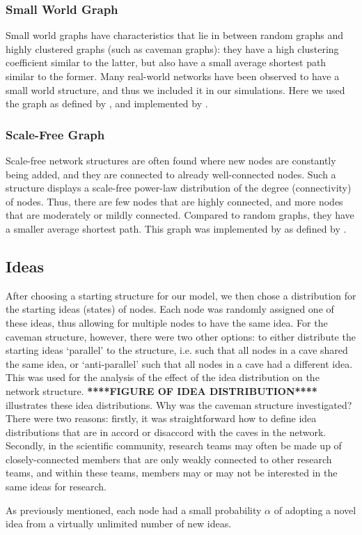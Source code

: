 \subsubsection{Small World Graph}
\label{4.4}

Small world graphs have characteristics that lie in between random graphs and highly clustered graphs (such as caveman graphs): they have a high clustering coefficient similar to the latter, but also have a small average shortest path similar to the former. Many real-world networks have been observed to have a small world structure, and thus we included it in our simulations. Here we used the graph as defined by \citet*{WS1998}, and implemented by \citet*{BS2011}.

\subsubsection{Scale-Free Graph}
\label{4.5}

Scale-free network structures are often found where new nodes are constantly being added, and they are connected to already well-connected nodes. Such a structure displays a scale-free power-law distribution of the degree (connectivity) of nodes. Thus, there are few nodes that are highly connected, and more nodes that are moderately or mildly connected. Compared to random graphs, they have a smaller average shortest path. This graph was implemented by \citet*{BS2011} as defined by \citet*{BA1999}.


\subsection{Ideas}
\label{4.6}

After choosing a starting structure for our model, we then chose a distribution for the starting ideas (states) of nodes. Each node was randomly assigned one of these ideas, thus allowing for multiple nodes to have the same idea. For the caveman structure, however, there were two other options: to either distribute the starting ideas `parallel' to the structure, i.e. such that all nodes in a cave shared the same idea, or `anti-parallel' such that all nodes in a cave had a different idea. This was used for the analysis of the effect of the idea distribution on the network structure. \textbf{****FIGURE OF IDEA DISTRIBUTION****} illustrates these idea distributions. Why was the caveman structure investigated? There were two reasons: firstly, it was straightforward how to define idea distributions that are in accord or disaccord with the caves in the network. Secondly, in the scientific community, research teams may often be made up of closely-connected members that are only weakly connected to other research teams, and within these teams, members may or may not be interested in the same ideas for research. 

As previously mentioned, each node had a small probability $\alpha$ of adopting a novel idea from a virtually unlimited number of new ideas.
